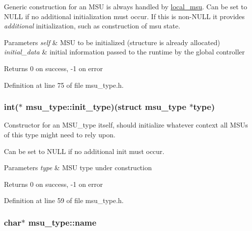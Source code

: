 Generic construction for an M\-S\-U is always handled by \hyperlink{structlocal__msu}{local\-\_\-msu}. Can be set to N\-U\-L\-L if no additional initialization must occur. If this is non-\/\-N\-U\-L\-L it provides {\itshape additional} initialization, such as construction of msu state. 
\begin{DoxyParams}{Parameters}
{\em self} & M\-S\-U to be initialized (structure is already allocated) \\
\hline
{\em initial\-\_\-data} & initial information passed to the runtime by the global controller \\
\hline
\end{DoxyParams}
\begin{DoxyReturn}{Returns}
0 on success, -\/1 on error 
\end{DoxyReturn}


Definition at line 75 of file msu\-\_\-type.\-h.

\hypertarget{structmsu__type_a5dd9b478727fefecff8cf16525003135}{
\subsubsection[{init\-\_\-type}]{\setlength{\rightskip}{0pt plus 5cm}int($\ast$ msu\-\_\-type\-::init\-\_\-type)(struct {\bf msu\-\_\-type} $\ast$type)}}\label{structmsu__type_a5dd9b478727fefecff8cf16525003135}


Constructor for an M\-S\-U\-\_\-type itself, should initialize whatever context all M\-S\-Us of this type might need to rely upon. 

Can be set to N\-U\-L\-L if no additional init must occur. 
\begin{DoxyParams}{Parameters}
{\em type} & M\-S\-U type under construction \\
\hline
\end{DoxyParams}
\begin{DoxyReturn}{Returns}
0 on success, -\/1 on error 
\end{DoxyReturn}


Definition at line 59 of file msu\-\_\-type.\-h.

\hypertarget{structmsu__type_ade4e1d9d98f0e22f3a54986919b07665}{
\subsubsection[{name}]{\setlength{\rightskip}{0pt plus 5cm}char$\ast$ msu\-\_\-type\-::name}}\label{structmsu__type_ade4e1d9d98f0e22f3a54986919b07665}


